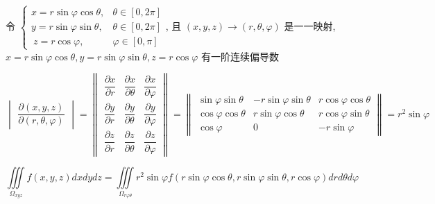 \begin{definition}[球面坐标系]
	令 $\begin{cases}
		x = r\sin\varphi\cos\theta, & \theta\in [0,2\pi]\\
		y = r\sin\varphi\sin\theta, & \theta\in [0,2\pi]\\\
		z = r\cos\varphi, & \varphi\in [0,\pi]
	\end{cases}$, 且 $(x,y,z) \to (r,\theta,\varphi)$ 是一一映射, $x = r\sin\varphi\cos\theta, y = r\sin\varphi\sin\theta, z = r\cos\varphi$ 有一阶连续偏导数

	$$\begin{vmatrix}
		\dfrac{\partial (x,y,z)}{\partial (r,\theta,\varphi)}
	\end{vmatrix} = 
	\begin{Vmatrix}
	  \dfrac{\partial x}{\partial r} & \dfrac{\partial x}{\partial \theta} & \dfrac{\partial x}{\partial \varphi} \\
	  \dfrac{\partial y}{\partial r} & \dfrac{\partial y}{\partial \theta} & \dfrac{\partial y}{\partial \varphi} \\
	  \dfrac{\partial z}{\partial r} & \dfrac{\partial z}{\partial \theta} & \dfrac{\partial z}{\partial \varphi}
	\end{Vmatrix} = 
	\begin{Vmatrix}
	  \sin\varphi\sin\theta & -r\sin\varphi\sin\theta & r\cos\varphi\cos\theta \\
	  \cos\varphi\cos\theta & r\sin\varphi\cos\theta & r\cos\varphi\sin\theta \\
	  \cos\varphi & 0 & -r\sin \varphi
	\end{Vmatrix} = r^{2}\sin\varphi$$

	$$\iiint\limits_{\Omega_{xyz}}f(x,y,z)dxdydz=\iiint\limits_{\Omega_{r\varphi\theta}}r^2\sin\varphi f(r\sin\varphi\cos\theta,r\sin\varphi\sin\theta,r\cos\varphi) drd\theta d\varphi$$
\end{definition}

